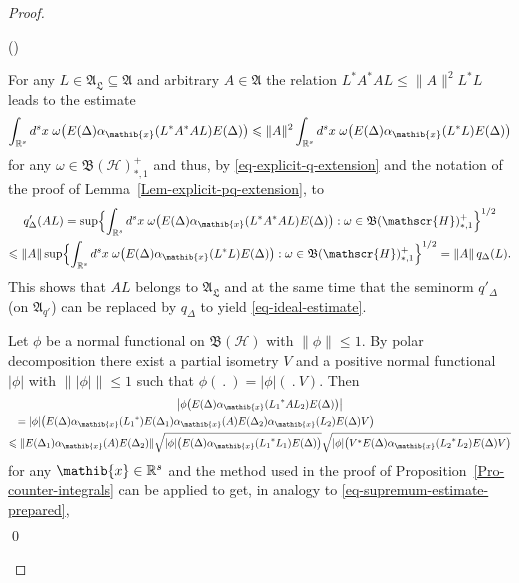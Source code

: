 \documentclass[11pt,twoside,openright]{report}
\theoremstyle{definition}
\theoremstyle{plain}
\theoremstyle{remark}
\theoremstyle{assumption}
\newcommand{\Bset}[1]{\Bigl\{ #1 \Bigr\}}
\newcommand{\abs}[1]{\lvert #1 \rvert}
\newcommand{\babs}[1]{\bigl\lvert #1 \bigr\rvert}
\newcommand{\norm}[1]{\lVert #1 \rVert}
\newcommand{\qD}{q_\Delta}
\newcommand{\qDx}[1]{q_\Delta ( #1 )}
\newcommand{\qprimeD}{q'_\Delta}
\newcommand{\qprimeDx}[1]{q'_\Delta ( #1 )}
\newcommand{\Afrak}{\mathfrak{A}}
\newcommand{\xib}{\mathib{x}}
\newcommand{\Rs}{\mathbb{R}^s}
\newcommand{\AL}{\mathfrak{A}_\mathfrak{L}}
\newcommand{\BH}{\mathfrak{B} ( \mathscr{H} )}
\newcommand{\ED}{E ( \Delta )}
\newcommand{\aibx}{\alpha_\mathib{x}}
\newcounter{proofitem}
\newenvironment{prooflist}{\begin{list}{(\roman{proofitem})}%
  {\usecounter{proofitem} \setlength{\topsep}{0ex}%
   \setlength{\parsep}{0.2ex} \setlength{\itemsep}{0.4ex}%
   \setlength{\leftmargin}{0em} \setlength{\itemindent}{0.5em}%
   \setlength{\listparindent}{1em}}}{\qed \end{list}}
\begin{document}
\begin{proof}
  \begin{prooflist}
  \item For any $L \in \AL \subseteq \Afrak$ and arbitrary $A \in
    \Afrak$ the relation $L^* A^* A L \leqslant \norm{A}^2 L^* L$
    leads to the estimate
    \begin{equation*}
      \int_{\Rs} d^s x \; \omega \bigl( \ED \aibx ( L^* A^* A L ) \ED
      \bigr) \leqslant \norm{A}^2 \int_{\Rs} d^s x \; \omega \bigl(
      \ED \aibx ( L^* L ) \ED \bigr)
    \end{equation*}
    for any $\omega \in \BH^+_{*,1}$ and thus, by
    \eqref{eq-explicit-q-extension} and the notation of the proof of
    Lemma~\ref{Lem-explicit-pq-extension}, to
    \begin{multline*}
      \qprimeDx{A L} = \sup \Bset{\int_{\Rs} d^s x \; \omega \bigl(
      \ED \aibx ( L^* A^* A L ) \ED \bigr) : \omega \in
      \BH^+_{*,1}}^{1/2} \\
      \leqslant \norm{A} \sup \Bset{\int_{\Rs} d^s x \; \omega \bigl(
      \ED \aibx ( L^* L ) \ED \bigr) : \omega \in \BH^+_{*,1}}^{1/2} =
      \norm{A} \, \qDx{L} \text{.}
    \end{multline*}
    This shows that $A L$ belongs to $\AL$ and at the same time that
    the seminorm $\qprimeD$ (on $\Afrak_{q'}$) can be replaced by
    $\qD$ to yield \eqref{eq-ideal-estimate}.
  \item Let $\phi$ be a normal functional on $\BH$ with $\norm{\phi}
    \leqslant 1$. By polar decomposition there exist a partial
    isometry $V$ and a positive normal functional $\abs{\phi}$ with
    $\norm{\abs{\phi}} \leqslant 1$ such that $\phi (~.~) = \abs{\phi}
    (~.~V )$. Then
    \begin{multline*}
      \babs{\phi \bigl( \ED \aibx ( {L_1}^* A L_2 ) \ED \bigr)} \\
      \shoveleft{= \abs{\phi} \bigl( \ED \aibx ( {L_1}^* ) E (
      \Delta_1 ) \aibx ( A ) E ( \Delta_2 ) \aibx ( L_2 ) \ED V
      \bigr)} \\
      \leqslant \norm{E ( \Delta_1 ) \aibx ( A ) E ( \Delta_2 )}
      \sqrt{\abs{\phi} \bigl( \ED \aibx ( {L_1}^* L_1 ) \ED \bigr)}
      \sqrt{\abs{\phi} \bigl( V^* \ED \aibx ( {L_2}^* L_2 ) \ED V
      \bigr)} 
    \end{multline*}
    for any $\xib \in \Rs$ and the method used in the proof of
    Proposition~\ref{Pro-counter-integrals} can be applied to get, in
    analogy to \eqref{eq-supremum-estimate-prepared},
    \begin{multline*}

\end{multline*}
\end{prooflist}
\end{proof}
\end{document}

